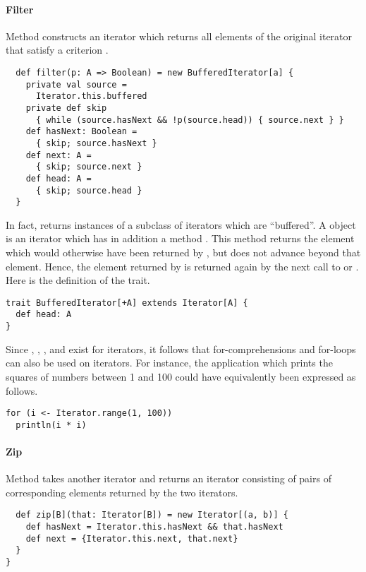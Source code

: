 {\paragraph{Filter} Method  constructs an iterator which
returns all elements of the original iterator that satisfy a criterion
.
\begin{lstlisting}
  def filter(p: A => Boolean) = new BufferedIterator[a] {
    private val source =
      Iterator.this.buffered
    private def skip
      { while (source.hasNext && !p(source.head)) { source.next } }
    def hasNext: Boolean =
      { skip; source.hasNext }
    def next: A =
      { skip; source.next }
    def head: A =
      { skip; source.head }
  }
\end{lstlisting}
In fact,  returns instances of a subclass of iterators
which are ``buffered''.  A  object is an
iterator which has in addition a method . This method
returns the element which would otherwise have been returned by
, but does not advance beyond that element. Hence, the
element returned by  is returned again by the next call to
 or . Here is the definition of the
 trait.
\begin{lstlisting}
trait BufferedIterator[+A] extends Iterator[A] {
  def head: A
}
\end{lstlisting}
Since , , , and 
exist for iterators, it follows that for-comprehensions and for-loops
can also be used on iterators. For instance, the application which prints the squares of numbers between 1 and 100 could have equivalently been expressed as follows.
\begin{lstlisting}
for (i <- Iterator.range(1, 100))
  println(i * i)
\end{lstlisting}

\paragraph{Zip} Method  takes another iterator and
returns an iterator consisting of pairs of corresponding elements
returned by the two iterators.
\begin{lstlisting}
  def zip[B](that: Iterator[B]) = new Iterator[(a, b)] {
    def hasNext = Iterator.this.hasNext && that.hasNext
    def next = {Iterator.this.next, that.next}
  }
}
\end{lstlisting}

}
